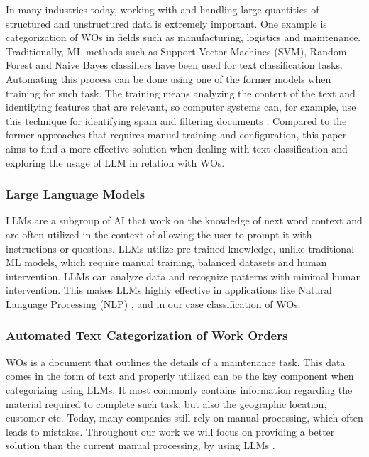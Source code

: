 \documentclass{article}
\begin{document}
In many industries today, working with and handling large quantities of structured and unstructured data is
extremely important.
One example is categorization of WOs in fields such as manufacturing, logistics and maintenance.
Traditionally, ML methods such as Support Vector Machines (SVM), Random Forest and Naive Bayes classifiers
have been used for text classification tasks.
Automating this process can be done using one of the former models when training for such task.
The training means analyzing the content of the text and identifying features that are relevant,
so computer systems can, for example, use this technique for identifying spam and filtering documents \cite{dalal2011}.
Compared to the former approaches that requires manual training and configuration,
this paper aims to find a more effective solution when dealing with text classification
and exploring the usage of LLM in relation with WOs.

\subsubsection{Large Language Models}

LLMs are a subgroup of AI that work on the knowledge of next word context and are often utilized
in the context of allowing the user to prompt it with instructions or questions.
LLMs utilize pre-trained knowledge, unlike traditional ML models, which require manual training,
balanced datasets and human intervention.
LLMs can analyze data and recognize patterns with minimal human intervention.
This makes LLMs highly effective in applications like Natural Language Processing (NLP) \cite{andersson2024},
and in our case classification of WOs.

\subsubsection{Automated Text Categorization of Work Orders}

WOs is a document that outlines the details of a maintenance task.
This data comes in the form of text and properly utilized can be the key component when categorizing using LLMs.
It most commonly contains information regarding the material required to complete such task,
but also the geographic location, customer etc.
Today, many companies still rely on manual processing, which often leads to mistakes.
Throughout our work we will focus on providing a better solution than the current manual processing,
by using LLMs \cite{ibm2023} \cite{li2024}.
\end{document}

